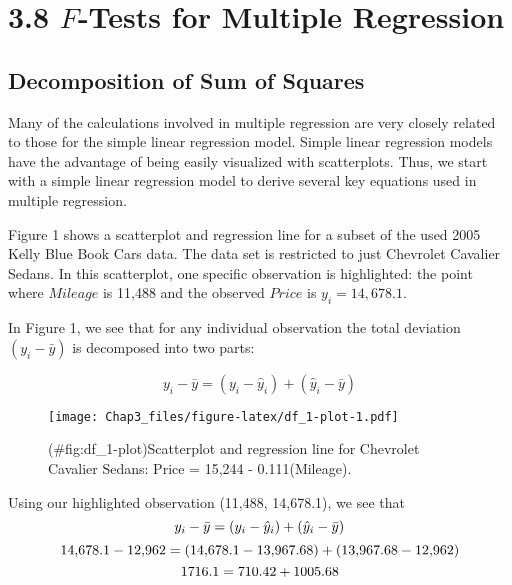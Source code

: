 \documentclass[
]{report}
\begin{document}
\section{\texorpdfstring{3.8 \(F\)-Tests for Multiple Regression}{3.8 F-Tests for Multiple Regression}}\label{f-tests-for-multiple-regression}

\subsection{Decomposition of Sum of Squares}\label{decomposition-of-sum-of-squares}

Many of the calculations involved in multiple regression are very closely related to those for the simple linear regression model. Simple linear regression models have the advantage of being easily visualized with scatterplots. Thus, we start with a simple linear regression model to derive several key equations used in multiple regression.

Figure 1 shows a scatterplot and regression line for a subset of the used 2005 Kelly Blue Book Cars data. The data set is restricted to just Chevrolet Cavalier Sedans. In this scatterplot, one specific observation is highlighted: the point where \(Mileage\) is 11,488 and the observed \(Price\) is \(y_i = 14{,}678.1\).

In Figure 1, we see that for any individual observation the total deviation \((y_i - \bar{y})\) is decomposed into two parts:

\begin{equation}
y_i - \bar{y} = (y_i - \hat{y}_i) + (\hat{y}_i - \bar{y})
\tag{3.7}
\end{equation}

\begin{figure}
\centering
\texttt{[image: Chap3\_files/figure-latex/df\_1-plot-1.pdf]}
\caption{(\#fig:df\_1-plot)Scatterplot and regression line for Chevrolet Cavalier Sedans: Price = 15,244 - 0.111(Mileage).}
\end{figure}

Using our highlighted observation (11,488, 14,678.1), we see that
\begin{equation}
y_i - \bar{y} = (y_i - \hat{y}_i) + (\hat{y}_i - \bar{y}) \notag
\end{equation}
\begin{equation}
14{,}678.1 - 12{,}962 = (14{,}678.1 - 13{,}967.68) + (13{,}967.68 - 12{,}962) \notag
\end{equation}
\begin{equation}
1716.1 = 710.42 + 1005.68 \notag
\end{equation}
\end{document}
